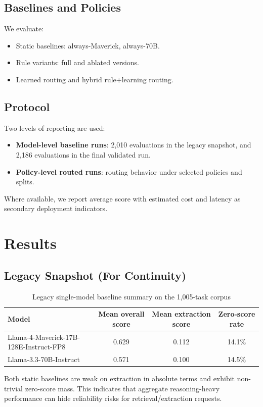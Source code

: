 \subsection{Baselines and Policies}
We evaluate:
\begin{itemize}[leftmargin=*]
  \item Static baselines: always-Maverick, always-70B.
  \item Rule variants: full and ablated versions.
  \item Learned routing and hybrid rule+learning routing.
\end{itemize}

\subsection{Protocol}
Two levels of reporting are used:
\begin{itemize}[leftmargin=*]
  \item \textbf{Model-level baseline runs}: 2,010 evaluations in the legacy snapshot, and 2,186 evaluations in the final validated run.
  \item \textbf{Policy-level routed runs}: routing behavior under selected policies and splits.
\end{itemize}
Where available, we report average score with estimated cost and latency as secondary deployment indicators.

\section{Results}
\subsection{Legacy Snapshot (For Continuity)}
\begin{table}[H]
\centering
\caption{Legacy single-model baseline summary on the 1,005-task corpus}
\begin{tabular}{lccc}
\toprule
Model & Mean overall score & Mean extraction score & Zero-score rate \\
\midrule
Llama-4-Maverick-17B-128E-Instruct-FP8 & 0.629 & 0.112 & 14.1\% \\
Llama-3.3-70B-Instruct & 0.571 & 0.100 & 14.5\% \\
\bottomrule
\end{tabular}
\end{table}

Both static baselines are weak on extraction in absolute terms and exhibit non-trivial zero-score mass. This indicates that aggregate reasoning-heavy performance can hide reliability risks for retrieval/extraction requests.

